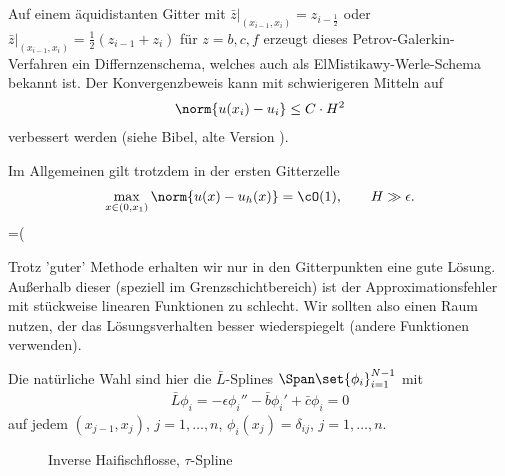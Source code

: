 \begin{bemerkung*}
  Auf einem äquidistanten Gitter mit $\bar z|_{(x_{i-1}, x_{i})} = z_{i - \frac 12}$ oder $\bar z|_{(x_{i-1}, x_{i})} = \frac 12 (z_{i-1} + z_{i})$ für $z = b, c, f$ erzeugt dieses Petrov-Galerkin-Verfahren ein Differnzenschema, welches auch als ElMistikawy-Werle-Schema bekannt ist. Der Konvergenzbeweis kann mit schwierigeren Mitteln auf
  \begin{align*}
    \norm{u(x_{i}) - u_{i}} \leq C\cdot H^{2}
  \end{align*}
  verbessert werden (siehe Bibel, alte Version ).
\end{bemerkung*}
Im Allgemeinen gilt trotzdem in der ersten Gitterzelle
\begin{align*}
  \max_{x \in (0, x_{1})} \norm{u(x) - u_{h}(x)} = \cO(1), \qquad H \gg\epsilon. 
\end{align*}
=(


Trotz 'guter' Methode erhalten wir nur in den Gitterpunkten eine gute Lösung. Außerhalb dieser (speziell im Grenzschichtbereich) ist der Approximationsfehler mit stückweise linearen Funktionen zu schlecht. Wir sollten also einen Raum nutzen, der das Lösungsverhalten besser wiederspiegelt (andere Funktionen verwenden). 

Die natürliche Wahl sind hier die $\bar L$-Splines $\Span \set{\phi_{i}}_{i = 1}^{N-1}$ mit
\begin{align*}
  \bar L \phi_{i} = - \epsilon \phi_{i}''  - \bar b \phi_{i}' + \bar c \phi_{i} = 0
\end{align*}
auf jedem $(x_{j-1}, x_{j})$, $j = 1, \dots, n$, $\phi_{i}(x_{j}) = \delta_{ij}$, $j = 1, \dots, n$. 

\begin{figure}[bht!]
  \centering
  \caption{Inverse Haifischflosse, $\tau$-Spline}
  \label{fig:hai2}
\end{figure}

